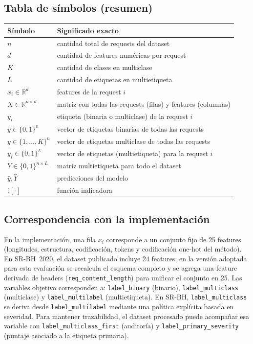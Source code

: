 \documentclass[12pt,oneside]{report}
\newcommand{\R}{\mathbb{R}}
\newcommand{\ind}{\mathbb{I}} %
\begin{document}
\subsection{Tabla de símbolos (resumen)}
\begin{longtable}{@{}ll@{}}
\toprule
\textbf{Símbolo} & \textbf{Significado exacto} \\
\midrule
$n$ & cantidad total de requests del dataset \\
$d$ & cantidad de features numéricas por request \\
$K$ & cantidad de clases en multiclase \\
$L$ & cantidad de etiquetas en multietiqueta \\
$x_i \in \R^d$ & features de la request $i$ \\
$X \in \R^{n\times d}$ & matriz con todas las requests (filas) y features (columnas) \\
$y_i$ & etiqueta (binaria o multiclase) de la request $i$ \\
$y \in \{0,1\}^n$ & vector de etiquetas binarias de todas las requests \\
$y \in \{1,\dots,K\}^n$ & vector de etiquetas multiclase de todas las requests \\
$y_i \in \{0,1\}^L$ & vector de etiquetas (multietiqueta) para la request $i$ \\
$Y \in \{0,1\}^{n\times L}$ & matriz multietiqueta para todo el dataset \\
$\hat{y}, \hat{Y}$ & predicciones del modelo \\
$\ind[\cdot]$ & función indicadora \\
\bottomrule
\end{longtable}

\subsection{Correspondencia con la implementación}
En la implementación, una fila $x_i$ corresponde a un conjunto fijo de 25 features (longitudes, estructura, codificación, tokens y codificación one-hot del método). En SR-BH~2020, el dataset publicado incluye 24 features; en la versión adoptada para esta evaluación se recalcula el esquema completo y se agrega una feature derivada de headers (\texttt{req\_content\_length}) para unificar el conjunto en 25.
Las variables objetivo corresponden a:
\texttt{label\_binary} (binario),
\texttt{label\_multiclass} (multiclase) y
\texttt{label\_multilabel} (multietiqueta).
En SR-BH, \texttt{label\_multiclass} se deriva desde \texttt{label\_multilabel} mediante una política explícita basada en severidad. Para mantener trazabilidad, el dataset procesado puede acompañar esa variable con \texttt{label\_multiclass\_first} (auditoría) y \texttt{label\_primary\_severity} (puntaje asociado a la etiqueta primaria).
\end{document}
